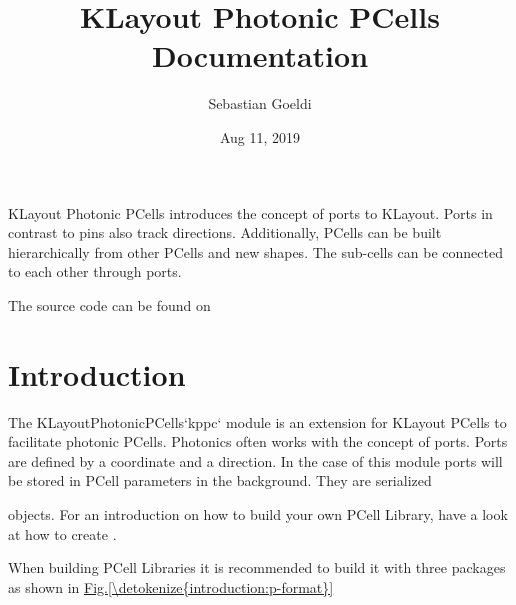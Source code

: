 \documentclass[a4paper,10pt,english]{sphinxmanual}
\title{KLayout Photonic PCells Documentation}
\date{Aug 11, 2019}
\author{Sebastian Goeldi}
\begin{document}
\pagestyle{empty}
\sphinxmaketitle
\pagestyle{plain}
\sphinxtableofcontents
\pagestyle{normal}
\label{\detokenize{index::doc}}


KLayout Photonic PCells introduces the concept of ports to KLayout. Ports in contrast to pins also track directions. Additionally, PCells can be built hierarchically from other PCells and new shapes. The sub-cells can be connected to each other through ports.

The source code can be found on %
\begin{footnote}[1]\sphinxAtStartFootnote
{}
%
\end{footnote}


\chapter{Introduction}
\label{\detokenize{introduction:introduction}}\label{\detokenize{introduction::doc}}
The KLayoutPhotonicPCells{}`kppc{}` module is an extension for KLayout PCells to facilitate photonic PCells.
Photonics often works with the concept of ports.
Ports are defined by a coordinate and a direction. In the case of this module ports will be stored in PCell parameters in the background.
They are serialized %
\begin{footnote}[2]\sphinxAtStartFootnote
{}
%
\end{footnote} objects. For an introduction on how to build your own PCell Library, have a look at
how to create {\hyperref[\detokenize{photonics/example_library::doc}]{}}.

When building PCell Libraries it is recommended to build it with three packages as shown in \hyperref[\detokenize{introduction:p-format}]{Fig.\@ \ref{\detokenize{introduction:p-format}}}
\end{document}
